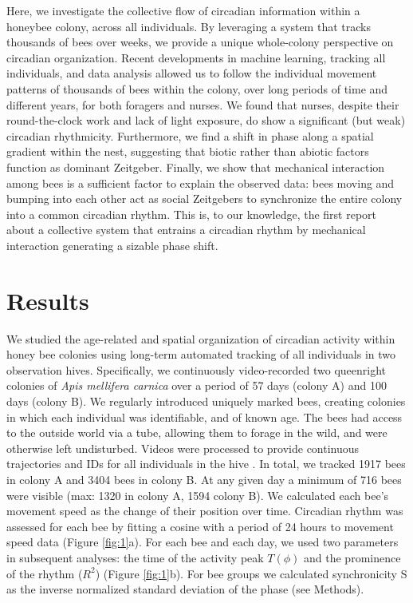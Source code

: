 \documentclass{article}
\newcommand{\added}[1]{{\color{blue}#1}}
\newcommand{\added}[1]{#1}
\begin{document}
Here, we investigate the collective flow of circadian information within a honeybee colony, across all individuals. \added{By leveraging a system that tracks thousands of bees over weeks, we provide a unique whole-colony perspective on circadian organization.} Recent developments in machine learning, tracking all individuals, and data analysis allowed us to follow the individual movement patterns of thousands of bees within the colony, over long periods of time and different years, for both foragers and nurses. We found that nurses, despite their round-the-clock work and lack of light exposure, do show a significant (but weak) circadian rhythmicity. Furthermore, we find a shift in phase along a spatial gradient within the nest, suggesting that biotic rather than abiotic factors function as dominant Zeitgeber. Finally, we show that mechanical interaction among bees is a sufficient factor to explain the observed data: bees moving and bumping into each other act as social Zeitgebers to synchronize the entire colony into a common circadian rhythm. This is, to our knowledge, the first report about a collective system that entrains a circadian rhythm by mechanical interaction generating a sizable phase shift. 


\section{Results}
We studied the age-related and spatial organization of circadian activity within honey bee colonies using long-term automated tracking of all individuals in two observation hives. Specifically, we continuously video-recorded two queenright colonies of \textit{Apis mellifera carnica} over a period of 57 days (colony A) and 100 days (colony B). We regularly introduced uniquely marked bees, creating colonies in which each individual was identifiable, and of known age. The bees had access to the outside world via a tube, allowing them to forage in the wild, and were otherwise left undisturbed. Videos were processed to provide continuous trajectories and IDs for all individuals in the hive \cite{wario_automatic_2015, boenisch_tracking_2018, wild_automatic_2018, wild_social_2021}. In total, we tracked 1917 bees in colony A and 3404 bees in colony B. At any given day a minimum of 716 bees were visible (max: 1320 in colony A, 1594 colony B). We calculated each bee’s movement speed as the change of their position over time. Circadian rhythm was assessed for each bee by fitting a cosine with a period of 24 hours to movement speed data (Figure \ref{fig:1}a). For each bee and each day, we used two parameters in subsequent analyses: the time of the activity peak $T(\phi)$ and the prominence of the rhythm ($R^2$) (Figure \ref{fig:1}b). For bee groups we calculated synchronicity S as the inverse normalized standard deviation of the phase (see Methods).  
\end{document}
